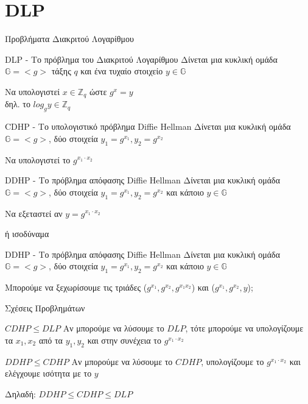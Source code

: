 \documentclass[handout]{beamer}
\begin{document}
\section{DLP}
\begin{frame}[allowframebreaks]{Προβλήματα Διακριτού Λογαρίθμου}

\begin{block}{DLP - Το πρόβλημα του Διακριτού Λογαρίθμου}
Δίνεται μια κυκλική ομάδα $\mathbb{G}=<g>$ τάξης $q$ και ένα τυχαίο στοιχείο $y \in \mathbb{G}$

Να υπολογιστεί $x \in \mathbb{Z}_q$ ώστε $g^x = y$ \\
δηλ. το $log_g y \in \mathbb{Z}_q$
\end{block}

\begin{block}{CDHP - Το υπολογιστικό πρόβλημα Diffie Hellman}
Δίνεται μια κυκλική ομάδα $\mathbb{G}=<g>$, δύο στοιχεία $y_1=g^{x_1}, y_2 = g^{x_2}$

Να υπολογιστεί το $g^{x_1 \cdot x_2}$ 
\end{block}


\framebreak

\begin{block}{DDHP - Το πρόβλημα απόφασης Diffie Hellman}
Δίνεται μια κυκλική  ομάδα $\mathbb{G}=<g>$, δύο στοιχεία $y_1=g^{x_1}, y_2 = g^{x_2}$ και κάποιο  $y \in \mathbb{G}$ 

Να εξεταστεί αν  $y = g^{x_1 \cdot x_2}$ 
\end{block}
ή ισοδύναμα
\begin{block}{DDHP - Το πρόβλημα απόφασης Diffie Hellman}
Δίνεται μια κυκλική  ομάδα $\mathbb{G}=<g>$, δύο στοιχεία $y_1=g^{x_1}, y_2 = g^{x_2}$ και κάποιο  $y \in \mathbb{G}$ 

Μπορούμε να ξεχωρίσουμε τις τριάδες ($g^{x_1}, g^{x_2}, g^{x_1x_2}$) και  ($g^{x_1}, g^{x_2}, y$);
\end{block}
\end{frame}

\begin{frame}{Σχέσεις Προβλημάτων}
\begin{block}{$CDHP \leq DLP$}
Αν μπορούμε να λύσουμε το $DLP$, τότε μπορούμε να υπολογίζουμε τα $x_1, x_2$ από τα $y_1, y_2$ και στην συνέχεια το $g^{x_1 \cdot x_2}$
\end{block}

\pause
 
\begin{block}{$DDHP \leq CDHP$}
Αν μπορούμε να λύσουμε το $CDHP$, υπολογίζουμε το $g^{x_1 \cdot x_2}$ και ελέγχουμε ισότητα με το $y$
\end{block}
 
\pause 
Δηλαδή: $DDHP \leq CDHP \leq DLP$
\end{frame}
 
\end{document}
